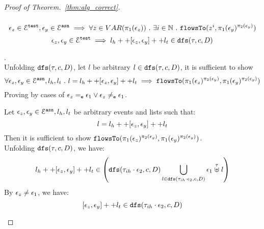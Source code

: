 \begin{proof}[Proof of Theorem.~\ref{thm:alg_correct}]
\begin{case}
\begin{equation}
\end{equation}
%
\begin{equation}
  \mathtt{\epsilon}_z \in \mathcal{E}^{\mathtt{{test}}}, \mathtt{\epsilon}_y \in \mathcal{E}^{\mathtt{{asn}}}
  \implies \forall z \in VAR(\pi_1(\mathtt{\epsilon}_z)) ~.~ \exists i \in\mathbb{N} ~.~
  \mathtt{flowsTo}(z^i, \pi_1(\mathtt{\epsilon}_y)^{\pi_2(\mathtt{\epsilon}_y)})
\end{equation}
%
\begin{equation}
  \mathtt{\epsilon}_z, \mathtt{\epsilon}_y \in \mathcal{E}^{\mathtt{{test}}}
  \implies l_h ++ [\mathtt{\epsilon}_z, \mathtt{\epsilon}_y] ++ l_t \in \mathtt{dfs}(\mathtt{\tau}, c, D)
\end{equation}
\begin{subcase}.
\\
Unfolding $\mathtt{dfs}(\mathtt{\tau}, c, D)$, let $l$ be arbitrary $l \in  \mathtt{dfs}(\mathtt{\tau}, c, D)$, it is sufficient to show 
\[
   \forall \mathtt{\epsilon}_z, \mathtt{\epsilon}_y \in \mathcal{E}^{\mathtt{{asn}}}, l_h, l_t ~.~ 
   l = l_h ++ [\mathtt{\epsilon}_z, \mathtt{\epsilon}_y] ++ l_t 
   \implies \mathtt{flowsTo}(\pi_1(\mathtt{\epsilon}_z)^{\pi_2(\mathtt{\epsilon}_y)}, \pi_1(\mathtt{\epsilon}_y)^{\pi_2(\mathtt{\epsilon}_y)})
\] 
%
Proving by cases of $\mathtt{\epsilon}_z =_{\mathtt{e}} \mathtt{\epsilon}_1 \lor \mathtt{\epsilon}_z \neq_{\mathtt{e}} \mathtt{\epsilon}_1$.
\begin{subsubcase}
Let $\mathtt{\epsilon}_z, \mathtt{\epsilon}_y \in \mathcal{E}^{\mathtt{{asn}}}, l_h, l_t$ be arbitrary events and lists such that:
\[
  l = l_h ++ [\mathtt{\epsilon}_z, \mathtt{\epsilon}_y] ++ l_t 
\]
%
Then it is sufficient to show $\mathtt{flowsTo}(\pi_1(\mathtt{\epsilon}_z)^{\pi_2(\mathtt{\epsilon}_y)}, \pi_1(\mathtt{\epsilon}_y)^{\pi_2(\mathtt{\epsilon}_y)})$.
\\
Unfolding $\mathtt{dfs}(\mathtt{\tau}, c, D)$, we have:
%
\[
  l_h ++ [\event_z, \event_y] ++ l_t  \in 
  \left( \kw{dfs}(\trace_{ih} \cdot \event_2, c, D) \bigcup\limits_{l \in \kw{dfs}(\trace_{ih} \cdot \event_2, c, D)} 
  \event_1 \stackrel{\trace}{\uplus} l \right)
\]
By $\mathtt{\epsilon}_z \neq \mathtt{\epsilon}_1$, we have:
\[
  [\mathtt{\epsilon}_z, \mathtt{\epsilon}_y] ++ l_t \in \mathtt{dfs}(\mathtt{\tau}_{ih} \cdot \mathtt{\epsilon}_2, c, D)
\]
%

\end{subsubcase}
\end{subcase}
\end{case}
\end{proof}
